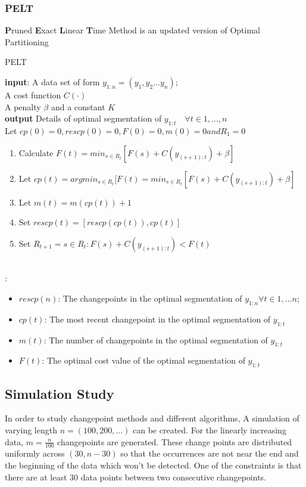 \documentclass{article}
\newcommand\tab[1][0.4cm]{\hspace*{#1}}
\begin{document}
\subsubsection{PELT}
\textbf{P}runed \textbf{E}xact \textbf{L}inear \textbf{T}ime Method is an updated version of Optimal Partitioning 
\begin{algorithm}
\caption{PELT}\label{alg:cap}

\textbf{input}: A data set of form $y_{1:n} = (y_{1},y_{2}...y_{n})$;\\
\qquad  \quad A cost function $C(\cdot)$\\
\qquad \quad A penalty $\beta$ and a constant $K$ \\
\textbf{output} Details of optimal segmentation of $y_{1:t} \quad \forall
t \in {1,...,n}$ \\
\tab Let $cp(0) = 0,rescp(0) = 0, F(0) = 0, m(0) = 0 and R_{1} = {0}$
\begin{algorithmic}
    \begin{enumerate}
        \item Calculate $F(t) = min_{s\in R_{t}} [F(s) + C(y_{(s+1) : t}) + \beta]$
        \item Let $cp(t) = argmin_{s\in R_{t}}{[F(t) = min_{s\in R_{t}} [F(s) + C(y_{(s+1) : t}) + \beta]}$
        \item Let $ m(t) = m(cp(t)) + 1$
        \item Set $rescp(t) = [rescp(cp(t)),cp(t)]$
        \item Set $R_{t+1} = {s \in R_{t} : F(s) + C(y_{(s+1) : t}) < F(t)}$
    \end{enumerate}
\EndFor\\
\Return : 
    \begin{itemize}
        \item $rescp(n)$: The changepoints in the optimal segmentation of $y_{1:n} \forall t \in {1,...n}$; 
        \item $cp(t)$: The most recent changepoint in the optimal segmentation of $y_{1:t}$
        \item $m(t)$: The number of changepoints in the optimal segmentation of $y_{1:t}$
        \item $F(t)$: The optimal cost value of the optimal segmentation of $y_{1:t}$
    \end{itemize}
\end{algorithmic}
\end{algorithm}

\subsection{Simulation Study}
In order to study changepoint methods and different algorithms, A simulation of varying length $n = (100,200,...)$ can be created. For the linearly increasing data, $m = \frac{n}{100}$ changepoints are generated. These change points are distributed uniformly across $(30,n-30)$ so that the occurrences are not near the end and the beginning of the data which won't be detected. One of the constraints is that there are at least 30 data points between two consecutive changepoints. 
\end{document}
